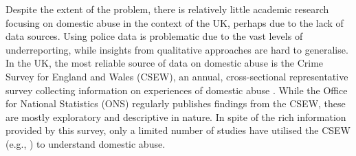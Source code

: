 \documentclass[11pt, a4paper]{article}
\begin{document}



Despite the extent of the problem, there is relatively little academic research focusing on domestic abuse in the context of the UK, perhaps due to the lack of data sources. Using police data is problematic due to the vast levels of underreporting, while insights from qualitative approaches are hard to generalise. In the UK, the most reliable source of data on domestic abuse is the Crime Survey for England and Wales (CSEW), an annual, cross-sectional representative survey collecting information on experiences of domestic abuse \cite{OfficeforNationalStatistics2019}.  While the Office for National Statistics (ONS) regularly publishes findings from the CSEW, these are mostly exploratory and descriptive in nature. In spite of the rich information provided by this survey, only a limited number of studies have utilised the CSEW (e.g., ) to understand domestic abuse. 
\end{document}
